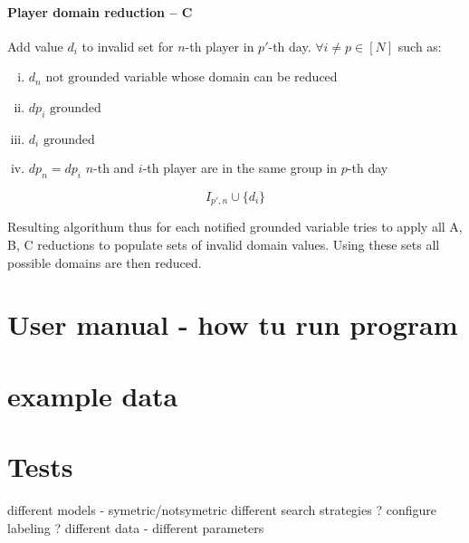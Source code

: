\documentclass[a4paper]{article}
\theoremstyle{definition}
\theoremstyle{remark}
\begin{document}
\paragraph{Player domain reduction -- C}
Add value $d_i$ to invalid set for $n$-th player in  $p'$-th day.
$ \forall i \neq p \in [N]$ such as:
\begin{enumerate}[(i)]
\item $d_n \text{ not grounded}$ \hfill variable whose domain can be reduced 
\item $dp_i \text{ grounded}$ 
\item $d_i \text{ grounded}$ 
\item $dp_n = dp_i$ \hfill $n$-th and $i$-th player are in the same group in $p$-th day
\end{enumerate}
$$ I_{p',n} \cup \{ d_i \} $$

Resulting algorithum thus for each notified grounded variable tries to apply all A, B, C reductions
to populate sets of invalid domain values. Using these sets all possible domains are then
reduced.

\section{User manual - how tu run program }
\section{example data}
\section{Tests}
different models - symetric/notsymetric
different search strategies ? configure labeling ? 
different data - different parameters
\end{document}
